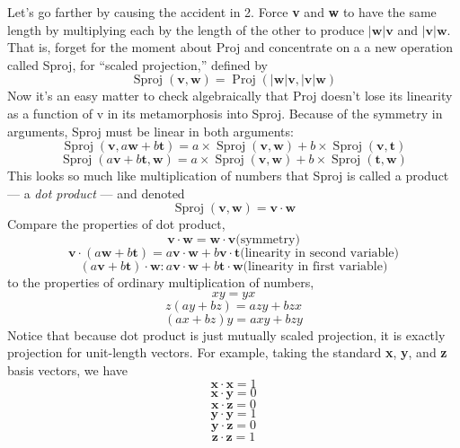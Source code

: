 \documentclass{book}
\begin{document}
Let's go farther by causing the accident in 2. Force \textbf{v} and \textbf{w} to
have the same length by multiplying each by the length of the other to
produce $|\mathbf{w}|\mathbf{v}$ and $|\mathbf{v}|\mathbf{w}$. That is, forget for the moment about Proj and
concentrate on a a new operation called Sproj, for ``scaled projection,''
defined by
$$\operatorname{Sproj}(\mathbf{v},\mathbf{w}) = \operatorname{Proj}(|\mathbf{w}|\mathbf{v}, |\mathbf{v}|\mathbf{w})$$
Now it's an easy matter to check algebraically that Proj doesn't lose its
linearity as a function of v in its metamorphosis into Sproj. Because of
the symmetry in arguments, Sproj must be linear in both arguments:
$$\operatorname{Sproj}(\mathbf{v}, a\mathbf{w} + b\mathbf{t}) = a \times \operatorname{Sproj}(\mathbf{v}, \mathbf{w}) + b \times \operatorname{Sproj}(\mathbf{v}, \mathbf{t})$$
$$\operatorname{Sproj}(a\mathbf{v} + b\mathbf{t}, \mathbf{w}) = a \times \operatorname{Sproj}(\mathbf{v},\mathbf{w}) + b \times \operatorname{Sproj}(\mathbf{t}, \mathbf{w})$$
This looks so much like multiplication of numbers that Sproj is called a
product --- a {\em dot product} --- and denoted
$$\operatorname{Sproj}(\mathbf{v},\mathbf{w}) = \mathbf{v} \cdot \mathbf{w}$$
Compare the properties of dot product,
$$\mathbf{v} \cdot \mathbf{w} = \mathbf{w} \cdot \mathbf{v} \text{(symmetry)}$$
$$\mathbf{v} \cdot (a\mathbf{w} + b\mathbf{t}) = a\mathbf{v} \cdot \mathbf{w} + b\mathbf{v} \cdot \mathbf{t} \text{(linearity in second variable)}$$
$$(a\mathbf{v} + b\mathbf{t}) \cdot \mathbf{w} : a\mathbf{v} \cdot \mathbf{w} + b\mathbf{t} \cdot \mathbf{w} \text{(linearity in first variable)}$$
 to the properties of ordinary multiplication of numbers,
$$xy = yx$$
$$z(ay + bz) = azy + bzx$$
$$(ax + bz)y = axy + bzy$$
 Notice that because dot product is just mutually scaled projection, it
is exactly projection for unit-length vectors. For example, taking the
standard \textbf{x}, \textbf{y}, and \textbf{z} basis vectors, we have
$$\mathbf{x} \cdot \mathbf{x}=1$$
$$\mathbf{x} \cdot \mathbf{y}=0$$
$$\mathbf{x} \cdot \mathbf{z}=0$$
$$\mathbf{y} \cdot \mathbf{y}=1$$
$$\mathbf{y} \cdot \mathbf{z}=0$$
$$\mathbf{z} \cdot \mathbf{z}=1$$
\end{document}
